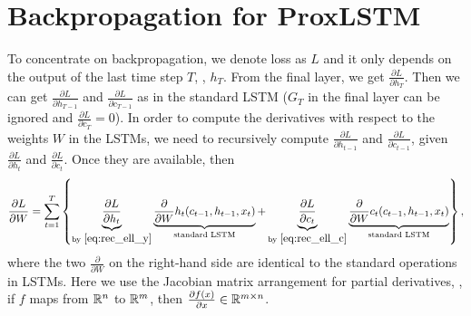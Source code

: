 \section{Backpropagation for ProxLSTM}

\label{app:gradient}
To concentrate on backpropagation,
we denote loss as $L$ and it only depends on the output of the last time step $T$, \ie, $h_T$.
From the final layer, we get $\frac{\partial L}{\partial h_T}$.
Then we can get $\frac{\partial L}{\partial h_{T-1}}$ and 
$\frac{\partial L}{\partial c_{T-1}}$ as in the standard LSTM ($G_T$ in the final layer can be ignored and 
$\frac{\partial L}{\partial c_T} = 0$). 
In order to compute the derivatives with respect to the weights $W$ in the LSTMs, we need to recursively compute 
$\frac{\partial L}{\partial h_{t-1}}$ and 
$\frac{\partial L}{\partial c_{t-1}}$,
given $\frac{\partial L}{\partial h_{t}}$ and 
$\frac{\partial L}{\partial c_{t}}$.
Once they are available, then
\begin{align}
\frac{\partial L}{\partial W} 
= \sum_{t=1}^T \left\{\underbrace{\frac{\partial L}{\partial h_t}}_{\text{by } \eqref{eq:rec_ell_y}} 
	\underbrace{\frac{\partial}{\partial W} h_t(c_{t-1}, h_{t-1}, x_t)}_{\text{standard LSTM}}
	+ \underbrace{\frac{\partial L}{\partial c_t}}_{\text{by } \eqref{eq:rec_ell_c}} \underbrace{\frac{\partial}{\partial W} c_t(c_{t-1}, h_{t-1}, x_t)}_{\text{standard LSTM}}\right\},
\end{align}
where the two $\frac{\partial}{\partial W}$ on the right-hand side are identical to the standard operations in LSTMs.
Here we use the Jacobian matrix arrangement for partial derivatives,
\ie,
if $f$ maps from $\mathbb{R}^n$ to $\mathbb{R}^m$,
then $\frac{\partial f(x)}{\partial x} \in \mathbb{R}^{m \times n}$. 

